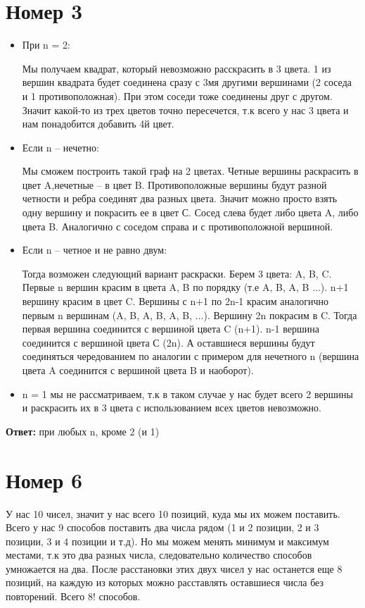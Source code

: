 \documentclass[a4paper,12pt]{article}
\begin{document}
\section*{Номер 3}
\begin{itemize}
\item При n = 2:

Мы получаем квадрат, который невозможно расскрасить в 3 цвета. 1 из вершин квадрата будет соединена сразу с 3мя другими вершинами (2 соседа и 1 противоположная). При этом соседи тоже соединены друг с другом. Значит какой-то из трех цветов точно пересечется, т.к всего у нас 3 цвета и нам понадобится добавить 4й цвет.

\item Если n -- нечетно:

Мы сможем построить такой граф на 2 цветах. Четные вершины раскрасить в цвет A,нечетные -- в цвет B. Противоположные вершины будут разной четности и ребра соединят два разных цвета. Значит можно просто взять одну вершину и покрасить ее в цвет С. Сосед слева будет либо цвета A, либо цвета B. Аналогично с соседом справа и с противоположной вершиной.

\item Если n -- четное и не равно двум: 

Тогда возможен следующий вариант раскраски. Берем 3 цвета: A, B, C. Первые n вершин красим в цвета A, B по порядку (т.е A, B, A, B $\ldots$). n+1 вершину красим в цвет C. Вершины с n+1 по 2n-1 красим аналогично первым n вершинам (A, B, A, B, A, B, $\ldots$). Вершину 2n покрасим в C. Тогда первая вершина соединится с вершиной цвета C (n+1). n-1 вершина соединится с вершиной цвета С (2n). А оставшиеся вершины будут соединяться чередованием по аналогии с примером для нечетного n (вершина цвета A соединится с вершиной цвета B и наоборот).

\item n = 1 мы не рассматриваем, т.к в таком случае у нас будет всего 2 вершины и раскрасить их в 3 цвета с использованием всех цветов невозможно.
\end{itemize}
\textbf{Ответ:} при любых n, кроме 2 (и 1)


\section*{Номер 6}
У нас 10 чисел, значит у нас всего 10 позиций, куда мы их можем поставить. Всего у нас 9 способов поставить два числа рядом (1 и 2 позиции, 2 и 3 позиции, 3 и 4 позиции и т.д). Но мы можем менять минимум и максимум местами, т.к это два разных числа, следовательно количество способов умножается на два. После расстановки этих двух чисел у нас останется еще 8 позиций, на каждую из которых можно расставлять оставшиеся числа без повторений. Всего 8! способов.
\end{document}
